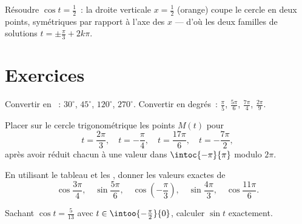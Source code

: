 \begin{omfigure}

{\small Résoudre $\cos t = \frac12$~: la droite verticale $x = \frac12$
(orange) coupe le cercle en deux points, symétriques par rapport à
l'axe des $x$ --- d'où les deux familles de solutions
$t = \pm\frac\pi3 + 2k\pi$.}
\end{omfigure}

\section{Exercices}

\begin{exercise}[$\star$]\label{exo:g11:trigo:1}
Convertir en ~: $30^\circ$, $45^\circ$, $120^\circ$, $270^\circ$.
Convertir en degrés~: $\frac{\pi}{5}$, $\frac{5\pi}{6}$,
$\frac{7\pi}{4}$, $\frac{2\pi}{9}$.
\end{exercise}

\begin{exercise}[$\star$]\label{exo:g11:trigo:2}
Placer sur le cercle trigonométrique les points $M(t)$ pour
\[
t = \frac{2\pi}{3},\quad
t = -\frac{\pi}{4},\quad
t = \frac{17\pi}{6},\quad
t = -\frac{7\pi}{2},
\]
après avoir réduit chacun à une valeur dans $\intoc{-\pi}{\pi}$ modulo
$2\pi$.
\end{exercise}

\begin{exercise}[$\star$]\label{exo:g11:trigo:3}
En utilisant le tableau et les , donner les valeurs
exactes de
\[
\cos\frac{3\pi}{4}, \quad
\sin\frac{5\pi}{6}, \quad
\cos\left(-\frac{\pi}{3}\right), \quad
\sin\frac{4\pi}{3}, \quad
\cos\frac{11\pi}{6} .
\]
\end{exercise}

\begin{exercise}[$\star$]\label{exo:g11:trigo:4}
Sachant $\cos t = \frac{5}{13}$ avec $t \in \intoo{-\frac\pi2}{0}$,
calculer $\sin t$ exactement.
\end{exercise}

